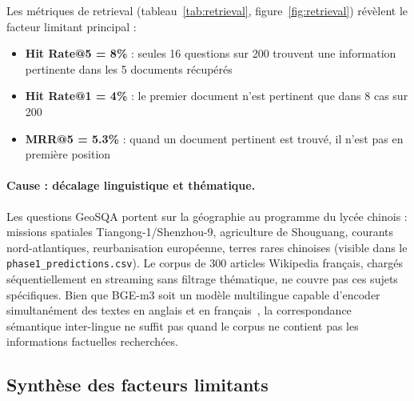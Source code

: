 \documentclass[12pt,a4paper]{article}
\begin{document}
Les métriques de retrieval (tableau~\ref{tab:retrieval}, figure~\ref{fig:retrieval}) révèlent le facteur limitant principal :

\begin{itemize}[leftmargin=*]
  \item \textbf{Hit Rate@5 = 8\%} : seules 16 questions sur 200 trouvent une information pertinente dans les 5 documents récupérés
  \item \textbf{Hit Rate@1 = 4\%} : le premier document n'est pertinent que dans 8 cas sur 200
  \item \textbf{MRR@5 = 5.3\%} : quand un document pertinent est trouvé, il n'est pas en première position
\end{itemize}

\paragraph{Cause : décalage linguistique et thématique.}
Les questions GeoSQA portent sur la géographie au programme du lycée chinois : missions spatiales Tiangong-1/Shenzhou-9, agriculture de Shouguang, courants nord-atlantiques, reurbanisation européenne, terres rares chinoises (visible dans le \texttt{phase1\_predictions.csv}). Le corpus de 300 articles Wikipedia français, chargés séquentiellement en streaming sans filtrage thématique, ne couvre pas ces sujets spécifiques. Bien que BGE-m3 soit un modèle multilingue capable d'encoder simultanément des textes en anglais et en français~\cite{chen2024bgem3}, la correspondance sémantique inter-lingue ne suffit pas quand le corpus ne contient pas les informations factuelles recherchées.

\subsection{Synthèse des facteurs limitants}
\end{document}
